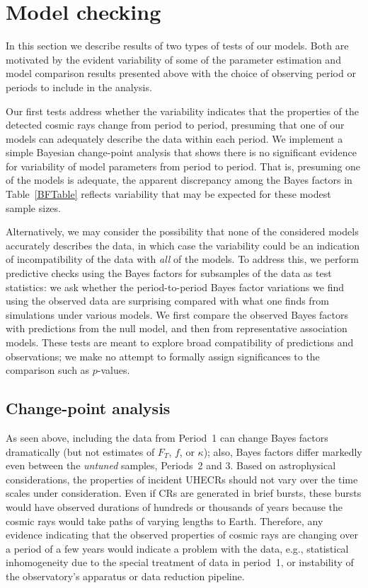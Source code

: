 \section{Model checking}\label{sec:checking}

In this section we describe results of two types of tests of our models.
Both are motivated by the evident variability of some of the parameter
estimation and model comparison results presented above with the choice of
observing period or periods to include in the analysis.

Our first tests address whether the variability indicates that the
properties of the detected cosmic rays change from period to period,
presuming that one of our models can adequately describe the data within
each period. We implement a simple Bayesian change-point analysis that shows
there is no significant evidence for variability of model parameters from
period to period.  That is, presuming one of the models is adequate, the
apparent discrepancy among the Bayes factors in Table~\ref{BFTable} reflects
variability that may be expected for these modest sample sizes.

Alternatively, we may consider the possibility that none of the considered
models accurately describes the data, in which case the variability could be
an indication of incompatibility of the data with {\em all} of the models.
To address this, we perform predictive checks using the Bayes factors for
subsamples of the data as test statistics:  we ask whether the
period-to-period Bayes factor variations we find using the observed data
are surprising compared with what one finds from simulations under various
models.  We first compare the observed Bayes factors with predictions from the
null model, and then from representative association models.  These tests
are meant to explore broad compatibility of predictions and
observations; we make no attempt to formally assign significances to the
comparison such as $p$-values.

\subsection{Change-point analysis}

As seen above, including the data from Period~1 can change Bayes factors
dramatically (but not estimates of $F_T$, $f$, or $\kappa$); also, Bayes
factors differ markedly even between the {\em untuned} samples, Periods~2
and 3.  Based on astrophysical considerations, the properties of incident
UHECRs should not vary over the time scales under consideration.  Even if CRs
are generated in brief bursts, these bursts would have observed durations of
hundreds or thousands of years because the cosmic rays would take paths of
varying lengths to Earth.  Therefore, any evidence indicating that the
observed properties of cosmic rays are changing over a period of a few years
would indicate a problem with the data, e.g., statistical inhomogeneity due to
the special treatment of data in period~1, or instability of the observatory's
apparatus or data reduction pipeline.

